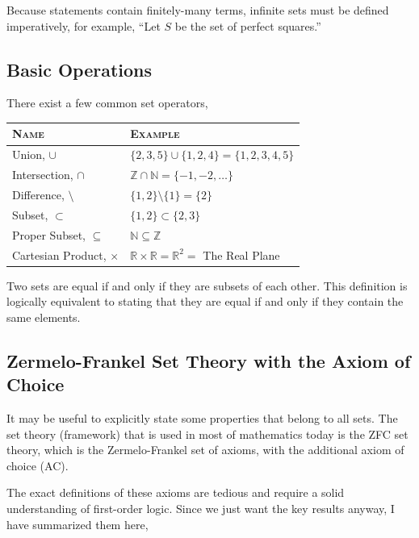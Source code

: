 \documentclass[letterpaper,twoside]{article}
\begin{document}
\begin{multicols}{2}
Because statements contain finitely-many terms, infinite sets must be defined imperatively, for example, ``Let $S$ be the set of perfect squares.''

\subsection{Basic Operations}

There exist a few common set operators,
\begin{table}[H]
    \centering
    \begin{doublespace}
        \setlength\tabcolsep{0pt}
        \begin{tabular*}{\linewidth}{@{\extracolsep{\fill}} ll}
            \textsc{Name} & \textsc{Example} \\
            \hline
            Union, $\cup$                            & $\{2, 3, 5\}\cup\{1, 2, 4\} = \{1, 2, 3, 4, 5\}$ \\
            Intersection, $\cap$                     & $\mathbb{Z}\cap\mathbb{N} = \{-1, -2, \ldots\}$ \\
            Difference, $\setminus$                  & $\{1, 2\} \setminus \{1\} = \{2\}$ \\
            Subset, $\subset$                        & $\{1, 2\} \subset \{2, 3\}$ \\
            Proper Subset, $\subseteq$               & $\mathbb{N} \subseteq \mathbb{Z}$ \\
            \small Cartesian Product, $\times$              & $\mathbb{R} \times \mathbb{R} = \mathbb{R}^2 =$ The Real Plane \\
        \end{tabular*}
    \end{doublespace}
    \normalsize
\end{table}

Two sets are equal if and only if they are subsets of each other.
This definition is logically equivalent to stating that they are equal if and only if they contain the same elements.

\subsection{Zermelo-Frankel Set Theory with the Axiom of Choice}

It may be useful to explicitly state some properties that belong to all sets.
The set theory (framework) that is used in most of mathematics today is the ZFC set theory, which is the Zermelo-Frankel set of axioms, with the additional axiom of choice (AC).

The exact definitions of these axioms are tedious and require a solid understanding of first-order logic.
Since we just want the key results anyway, I have summarized them here,

\end{multicols}
\end{document}
